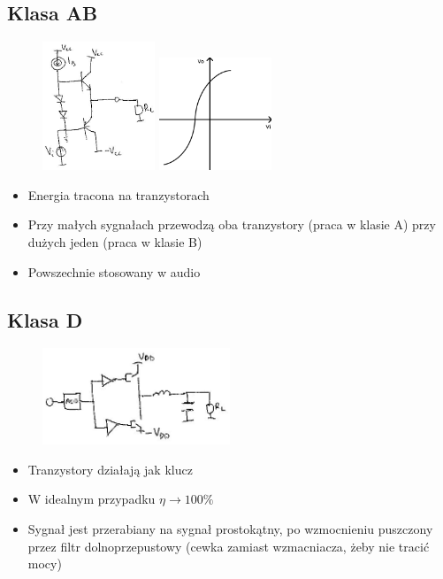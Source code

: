 \documentclass[10pt,a4paper]{article}
\begin{document}
\subsection{Klasa AB}
\begin{figure}[H]
\centering
\includegraphics[width=0.3\textwidth]{wzm_moc_ab.png}
\includegraphics[width=0.3\textwidth]{wzm_moc_ab_wyk.png}
\end{figure}
\begin{itemize}
\item{Energia tracona na tranzystorach}
\item{Przy małych sygnałach przewodzą oba tranzystory (praca w klasie A) przy dużych jeden (praca w klasie B)}
\item{Powszechnie stosowany w audio}
\end{itemize}

\subsection{Klasa D}
\begin{figure}[H]
\centering
\includegraphics[width=0.5\textwidth]{wzm_moc_d.png}
\end{figure}
\begin{itemize}
\item{Tranzystory działają jak klucz}
\item{W idealnym przypadku $\eta \rightarrow 100\%$}
\item{Sygnał jest przerabiany na sygnał prostokątny, po wzmocnieniu puszczony przez filtr dolnoprzepustowy (cewka zamiast wzmacniacza, żeby nie tracić mocy)}
\end{itemize}
\end{document}
